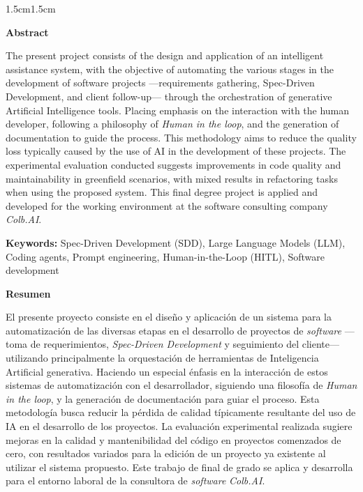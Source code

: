 \documentclass[11pt, letterpaper]{article}
\begin{document}
\begin{adjustwidth}{1.5cm}{1.5cm}
{ %
\hspace{0pt} 
\vfill
\large
\begin{center}
{\textbf{Abstract}}
\end{center}
The present project consists of the design and application of an intelligent assistance system, with the objective of automating the various stages in the development of software projects ---requirements gathering, Spec-Driven Development, and client follow-up--- through the orchestration of generative Artificial Intelligence tools. Placing emphasis on the interaction with the human developer, following a philosophy of \textit{Human in the loop}, and the generation of documentation to guide the process. This methodology aims to reduce the quality loss typically caused by the use of AI in the development of these projects. The experimental evaluation conducted suggests improvements in code quality and maintainability in greenfield scenarios, with mixed results in refactoring tasks when using the proposed system. This final degree project is applied and developed for the working environment at the software consulting company \textit{Colb.AI}.

\medskip
{
\small
\noindent\textbf{Keywords:} Spec-Driven Development (SDD), Large Language Models (LLM), Coding agents, Prompt engineering, Human-in-the-Loop (HITL), Software development
}
\vfill
\hspace{0pt}
}

\newpage
{ %
\hspace{0pt}
\vfill
\large 
\begin{center}
{\textbf{Resumen}}
\end{center}
El presente proyecto consiste en el diseño y aplicación de un sistema para la automatización de las diversas etapas en el desarrollo de proyectos de \textit{software} ---toma de requerimientos, \textit{Spec-Driven Development} y seguimiento del cliente--- utilizando principalmente la orquestación de herramientas de Inteligencia Artificial generativa. Haciendo un especial énfasis en la interacción de estos sistemas de automatización con el desarrollador, siguiendo una filosofía de \textit{Human in the loop}, y la generación de documentación para guiar el proceso. Esta metodología busca reducir la pérdida de calidad típicamente resultante del uso de IA en el desarrollo de los proyectos. La evaluación experimental realizada sugiere mejoras en la calidad y mantenibilidad del código en proyectos comenzados de cero, con resultados variados para la edición de un proyecto ya existente al utilizar el sistema propuesto. Este trabajo de final de grado se aplica y desarrolla para el entorno laboral de la consultora de \textit{software} \textit{Colb.AI}.

}
\end{adjustwidth}
\end{document}
